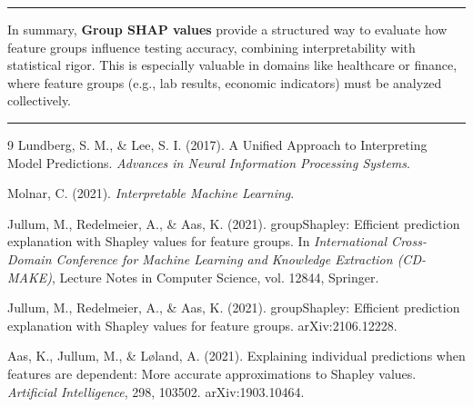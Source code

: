 \documentclass[11pt]{article}
\theoremstyle{remark}
\begin{document}
\bigskip
\hrule
\bigskip

\noindent
In summary, \textbf{Group SHAP values} provide a structured way to evaluate how feature groups influence testing accuracy, combining interpretability with statistical rigor. This is especially valuable in domains like healthcare or finance, where feature groups (e.g., lab results, economic indicators) must be analyzed collectively.

\bigskip
\hrule
\bigskip

\begin{thebibliography}{9}
    Lundberg, S. M., \& Lee, S. I. (2017).
    A Unified Approach to Interpreting Model Predictions.
    \emph{Advances in Neural Information Processing Systems}.

    Molnar, C. (2021).
    \emph{Interpretable Machine Learning}.

    Jullum, M., Redelmeier, A., \& Aas, K. (2021).
    groupShapley: Efficient prediction explanation with Shapley values for feature groups.
    In \emph{International Cross-Domain Conference for Machine Learning and Knowledge Extraction (CD-MAKE)},
    Lecture Notes in Computer Science, vol. 12844, Springer.

    Jullum, M., Redelmeier, A., \& Aas, K. (2021).
    groupShapley: Efficient prediction explanation with Shapley values for feature groups.
    arXiv:2106.12228.

    Aas, K., Jullum, M., \& L\o land, A. (2021).
    Explaining individual predictions when features are dependent: More accurate approximations to Shapley values.
    \emph{Artificial Intelligence}, 298, 103502. arXiv:1903.10464.
\end{thebibliography}
\end{document}
